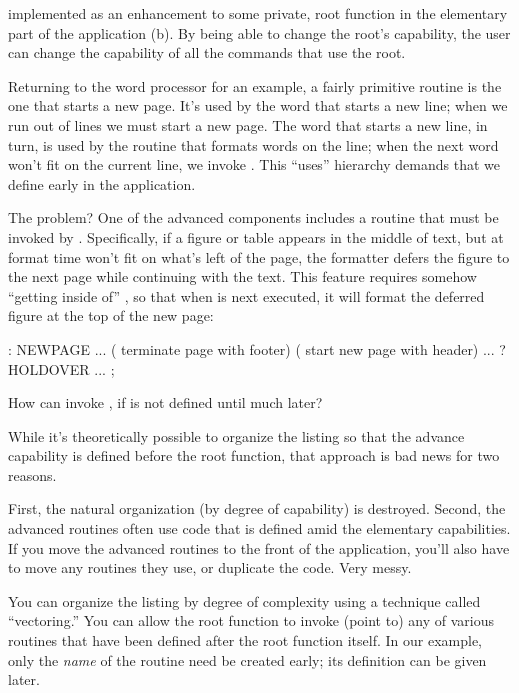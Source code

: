 
implemented as an enhancement to some private, root function in the
elementary part of the application (b). By being able to
change the root's capability, the user can change the capability of all the
commands that use the root.

Returning to the word processor for an example, a fairly primitive
routine is the one that starts a new page. It's used by the word that
starts a new line; when we run out of lines we must start a new
page. The word that starts a new line, in turn, is used by the routine
that formats words on the line; when the next word won't fit on the
current line, we invoke . This ``uses'' hierarchy demands that
we define  early in the application.

The problem? One of the advanced components includes a routine that
must be invoked by . Specifically, if a figure or table appears
in the middle of text, but at format time won't fit on what's left of
the page, the formatter defers the figure to the next page while
continuing with the text. This feature requires somehow ``getting
inside of'' , so that when  is next executed, it will
format the deferred figure at the top of the new page:

\begin{Code}
: NEWPAGE ... ( terminate page with footer)
( start new page with header) ... ?HOLDOVER ... ;
\end{Code}

How can  invoke , if  is not
defined until much later?

While it's theoretically possible to organize the listing so that the
advance capability is defined before the root function, that approach is
bad news for two reasons.

First, the natural organization (by degree of capability) is
destroyed. Second, the advanced routines often use code that is defined
amid the elementary capabilities. If you move the advanced routines to
the front of the application, you'll also have to move any routines they
use, or duplicate the code. Very messy.

You can organize the listing by degree of complexity using a technique
called ``vectoring.'' You can allow the root function to invoke (point
to) any of various routines that have been defined after the root
function itself. In our example, only the \emph{name} of the routine
 need be created early; its definition can be given later.

